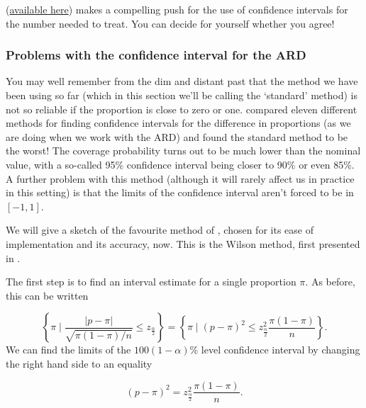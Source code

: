 \documentclass[
  openany]{book}
\theoremstyle{definition}
\theoremstyle{definition}
\theoremstyle{definition}
\theoremstyle{definition}
\theoremstyle{remark}
\begin{document}
\citet{altman1998confidence} (\href{https://www.bmj.com/content/bmj/317/7168/1309.full.pdf}{available here}) makes a compelling push for the use of confidence intervals for the number needed to treat. You can decide for yourself whether you agree!

\subsubsection*{Problems with the confidence interval for the ARD}\label{problems-with-the-confidence-interval-for-the-ard}

You may well remember from the dim and distant past that the method we have been using so far (which in this section we'll be calling the `standard' method) is not so reliable if the proportion is close to zero or one. \citet{newcombe1998interval} compared eleven different methods for finding confidence intervals for the difference in proportions (as we are doing when we work with the ARD) and found the standard method to be the worst! The coverage probability turns out to be much lower than the nominal value, with a so-called 95\% confidence interval being closer to 90\% or even 85\%. A further problem with this method (although it will rarely affect us in practice in this setting) is that the limits of the confidence interval aren't forced to be in \(\left[-1,1\right]\).

We will give a sketch of the favourite method of \citet{newcombe1998interval}, chosen for its ease of implementation and its accuracy, now. This is the Wilson method, first presented in \citet{wilson1927probable}.

The first step is to find an interval estimate for a single proportion \(\pi\). As before, this can be written

\[\left\lbrace \pi \mid \frac{\lvert p - \pi \rvert}{\sqrt{\pi\left(1-\pi\right)/n}} \leq z_{\frac{\alpha}{2}} \right\rbrace = \left\lbrace \pi \mid \left(p - \pi\right)^2 \leq z^2_{\frac{\alpha}{2}}\frac{\pi\left(1-\pi\right)}{n} \right\rbrace. \]
We can find the limits of the \(100\left(1-\alpha\right)\)\% level confidence interval by changing the right hand side to an equality

\begin{equation}
\left(p - \pi\right)^2 = z^2_{\frac{\alpha}{2}}\frac{\pi\left(1-\pi\right)}{n}.
\label{eq:newcombe1}
\end{equation}
\end{document}
